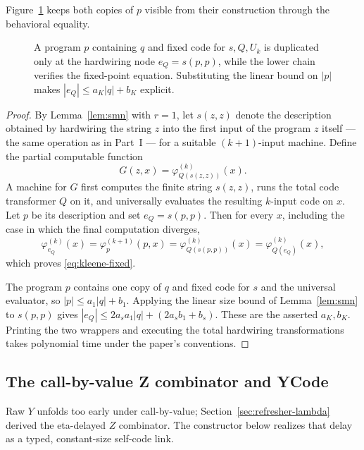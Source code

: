 Figure~\ref{fig:kleene-sizes} keeps both copies of \(p\) visible from their
construction through the behavioral equality.
\begin{figure}[t]
\centering

\caption{A program \(p\) containing \(q\) and fixed code for \(s,Q,U_k\) is duplicated only at the hardwiring node \(e_Q=s(p,p)\), while the lower chain verifies the fixed-point equation.  Substituting the linear bound on \(|p|\) makes \(|e_Q|\le a_K|q|+b_K\) explicit.}
\label{fig:kleene-sizes}
\end{figure}

\begin{proof}
By Lemma~\ref{lem:smn} with \(r=1\), let \(s(z,z)\) denote the description
obtained by hardwiring the string \(z\) into the first input of the program
\(z\) itself --- the same operation as in Part~I --- for a suitable
\((k+1)\)-input machine.  Define the partial computable function
\[
 G(z,x)=\varphi_{Q(s(z,z))}^{(k)}(x).
\]
A machine for \(G\) first computes the finite string \(s(z,z)\), runs the total
code transformer \(Q\) on it, and universally evaluates the resulting
\(k\)-input code on \(x\).  Let \(p\) be its description and set
\(e_Q=s(p,p)\).  Then for every \(x\), including the case in which the final
computation diverges,
\[
 \varphi_{e_Q}^{(k)}(x)
 =\varphi_p^{(k+1)}(p,x)
 =\varphi_{Q(s(p,p))}^{(k)}(x)
 =\varphi_{Q(e_Q)}^{(k)}(x),
\]
which proves \eqref{eq:kleene-fixed}.

The program \(p\) contains one copy of \(q\) and fixed code for \(s\) and the
universal evaluator, so \(|p|\leq a_1|q|+b_1\).  Applying the linear size bound
of Lemma~\ref{lem:smn} to \(s(p,p)\) gives
\(|e_Q|\leq2a_s a_1|q|+(2a_sb_1+b_s)\).  These are the asserted
\(a_K,b_K\).  Printing the two wrappers and executing the total hardwiring
transformations takes polynomial time under the paper's conventions.
\end{proof}

\subsection{The call-by-value Z combinator and YCode}

\begin{reminder}
Raw \(Y\) unfolds too early under call-by-value; Section~\ref{sec:refresher-lambda}
derived the eta-delayed \(Z\) combinator.  The constructor below realizes that
delay as a typed, constant-size self-code link.
\end{reminder}

